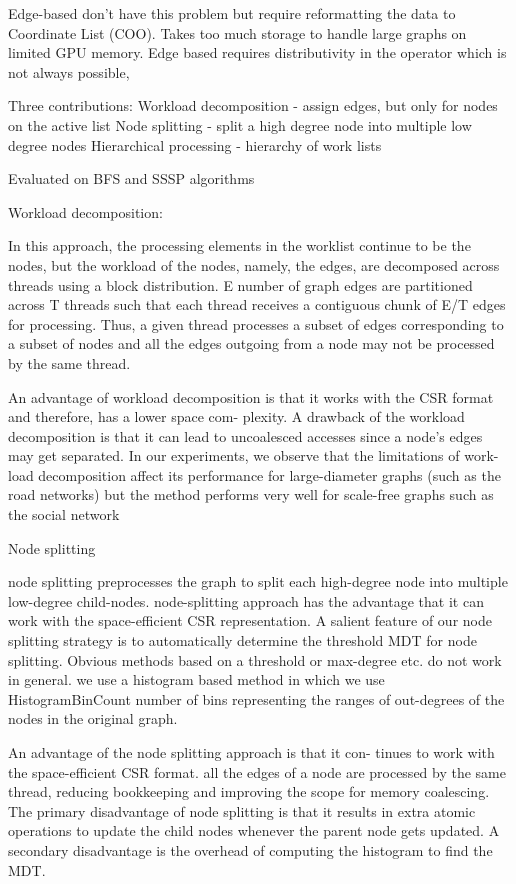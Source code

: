 \documentclass{article}
\begin{document}
Edge-based don’t have this problem but require reformatting the data to Coordinate List (COO).  Takes too much storage to handle large graphs on limited GPU memory.
Edge based requires distributivity in the operator which is not always possible,

Three contributions:
Workload decomposition - assign edges, but only for nodes on the active list
Node splitting - split a high degree node into multiple low degree nodes
Hierarchical processing - hierarchy of work lists

Evaluated on BFS and SSSP algorithms

Workload decomposition:

In this approach, the processing elements in the worklist continue to be the nodes, but the workload of the nodes, namely, the edges, are decomposed across threads using a block distribution. E number of graph edges are partitioned across T threads such that each thread receives a contiguous chunk of E/T edges for processing. Thus, a given thread processes a subset of edges corresponding to a subset of nodes and all the edges outgoing from a node may not be processed by the same thread. 

An advantage of workload decomposition is that it works with the CSR format and therefore, has a lower space com- plexity. 
A drawback of the workload decomposition is that it can lead to uncoalesced accesses since a node’s edges may get separated. 
In our experiments, we observe that the limitations of work- load decomposition affect its performance for large-diameter graphs (such as the road networks) but the method performs very well for scale-free graphs such as the social network 

Node splitting

node splitting preprocesses the graph to split each high-degree node into multiple low-degree child-nodes.
node-splitting approach has the advantage that it can work with the space-efficient CSR representation. 
A salient feature of our node splitting strategy is to automatically determine the threshold MDT for node splitting. Obvious methods based on a threshold or max-degree etc. do not work in general.   we use a histogram based method in which we use HistogramBinCount number of bins representing the ranges of out-degrees of the nodes in the original graph. 

An advantage of the node splitting approach is that it con- tinues to work with the space-efficient CSR format.
all the edges of a node are processed by the same thread, reducing bookkeeping and improving the scope for memory coalescing. The primary disadvantage of node splitting is that it results in extra atomic operations to update the child nodes whenever the parent node gets updated. A secondary disadvantage is the overhead of computing the histogram to find the MDT. 
\end{document}
